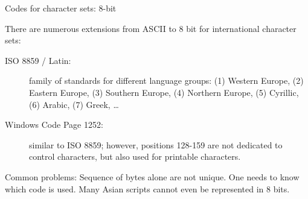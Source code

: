 \documentclass[11pt,compress,t,notes=noshow, xcolor=table]{beamer}
\begin{document}
\begin{vbframe}{Codes for character sets: 8-bit}

There are numerous extensions from ASCII to $8$ bit for international character sets:
\begin{description}
 \item[ISO 8859 / Latin:] family of standards for different
  language groups: (1) Western Europe, (2) Eastern Europe, (3) Southern Europe, (4)
  Northern Europe, (5) Cyrillic, (6) Arabic, (7) Greek, \ldots
 \item[Windows Code Page 1252:] similar to ISO 8859; however, positions
  128-159 are not dedicated to control characters, but also used for printable characters.
\end{description}

Common problems: Sequence of bytes alone are not unique. One
needs to know which code is used. Many Asian scripts
cannot even be represented in 8 bits.
\end{vbframe}
\end{document}
